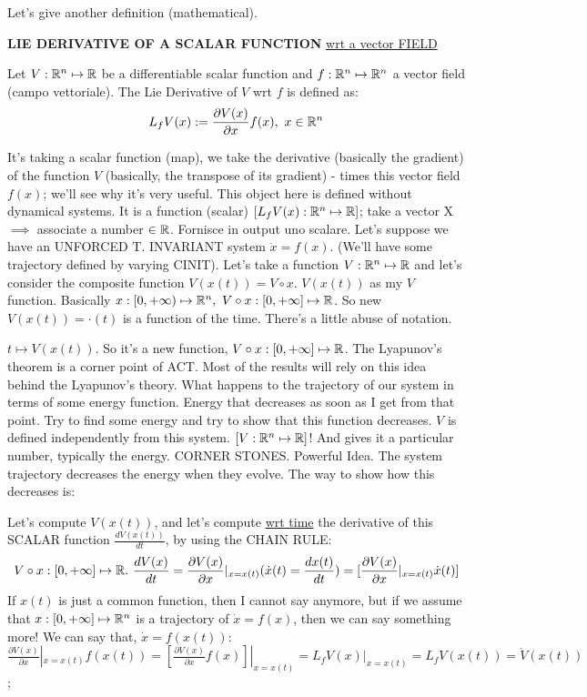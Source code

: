 Let's give another definition (mathematical).

\begin{defn}{\textbf{LIE DERIVATIVE OF A SCALAR FUNCTION} \underline{wrt a vector FIELD}}

Let $V:\mathbb{R}^n \mapsto \mathbb{R}$ be a differentiable scalar function and $f:\mathbb{R}^n \mapsto \mathbb{R}^n$ a vector field (campo vettoriale). The Lie Derivative of $V$ wrt $f$ is defined as:
\[
	L_fV(x) := \frac{\partial{V(x)}}{\partial{x}}f(x),\ x \in \mathbb{R}^n
\]
\end{defn}

It's taking a scalar function (map), we take the derivative (basically the gradient) of the function $V$ (basically, the transpose of its gradient) - times this vector field $f(x)$; we'll see why it's very useful.
This object here is defined without dynamical systems. It is a function (scalar) $[L_fV(x):\mathbb{R}^n \mapsto \mathbb{R}]$; take a vector X $\implies$ associate a number $\in \mathbb{R}$. Fornisce in output uno scalare.
Let's suppose we have an UNFORCED T. INVARIANT system $\dot{x}=f(x)$. (We'll have some trajectory defined by varying CINIT). Let's take a function $V:\mathbb{R}^n \mapsto \mathbb{R}$ and let's consider the composite function $V(x(t)) = V \circ x$. $V(x(t))$ as my $V$ function. Basically $x:[0,+\infty) \mapsto \mathbb{R}^n,\ V \circ x:[0,+\infty] \mapsto \mathbb{R}$. So new $V(x(t)) = \mathord{\cdot}(t)$ is a function of the time. There's a little abuse of notation.

$t \mapsto V(x(t))$. So it's a new function, $V \circ x: [0,+\infty]\mapsto \mathbb{R}$. The Lyapunov's theorem is a corner point of ACT. Most of the results will rely on this idea behind the Lyapunov's theory. What happens to the trajectory of our system in terms of some energy function. Energy that decreases as soon as I get from that point. Try to find some energy and try to show that this function decreases. $V$ is defined independently from this system. $[V:\mathbb{R}^n \mapsto \mathbb{R}]$! And gives it a particular number, typically the energy. CORNER STONES. Powerful Idea.
The system trajectory decreases the energy when they evolve. The way to show how this decreases is:

Let's compute $V(x(t))$, and let's compute \underline{wrt time} the derivative of this SCALAR function $\frac{dV(x(t))}{dt}$, by using the CHAIN RULE:
\[
	V \circ x:[0,+\infty] \mapsto \mathbb{R}.\ \frac{dV(x)}{dt} = \frac{\partial{V(x)}}{\partial{x}}|_{x=x(t)}(\dot{x}(t)=\frac{dx(t)}{dt}) = [\frac{\partial{V(x)}}{\partial{x}}|_{x=x(t)}\dot{x}(t)]
\]
If $x(t)$ is just a common function, then I cannot say anymore, but if we assume that $x:[0,+\infty] \mapsto \mathbb{R}^n$ is a trajectory of $\dot{x}=f(x)$, then we can say something more! We can say that, $\dot{x}=f(x(t))$:
$\frac{\partial{V(x)}}{\partial{x}}|_{x=x(t)}f(x(t)) = [\frac{\partial{V(x)}}{\partial{x}}f(x)]|_{x=x(t)} = L_fV(x)|_{x=x(t)} = L_fV(x(t)) = \dot{V}(x(t))$;

